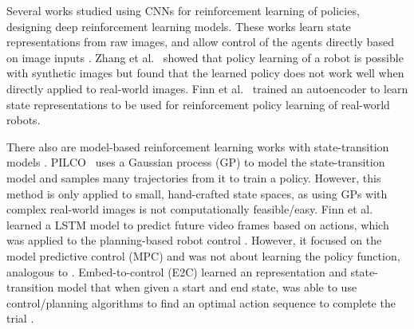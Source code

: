 \documentclass[letterpaper, 10 pt, conference]{ieeeconf}
\begin{document}

Several works studied using CNNs for reinforcement learning of policies, designing deep reinforcement learning models. These works learn state representations from raw images, and allow control of the agents directly based on image inputs \cite{mnih2013playing,koutnik2014online,heess2015learning,zhang2015towards,finn2016auto}.
Zhang et al.~\cite{zhang2015towards} showed that policy learning of a robot is possible with synthetic images but found that the learned policy does not work well when directly applied to real-world images. Finn et al.~\cite{finn2016auto} trained an autoencoder to learn state representations to be used for reinforcement policy learning of real-world robots.


There also are model-based reinforcement learning works with state-transition models \cite{watter2015embed,lenz2015deepmpc,finn2017deep}.
PILCO~\cite{deisenroth2011pilco,mcallister2017data} uses a Gaussian process (GP) to model the state-transition model and samples many trajectories from it to train a policy. However, this method is only applied to small, hand-crafted state spaces, as using GPs with complex real-world images is not computationally feasible/easy. Finn et al.~\cite{finn2016unsupervised} learned a LSTM model to predict future video frames based on actions, which was applied to the planning-based robot control \cite{finn2017deep}. However, it focused on the model predictive control (MPC) and was not about learning the policy function, analogous to \cite{wahlstrom2015pixels}. Embed-to-control (E2C) learned an representation and state-transition model that when given a start and end state, was able to use control/planning algorithms to find an optimal action sequence to complete the trial \cite{watter2015embed}.
\end{document}
